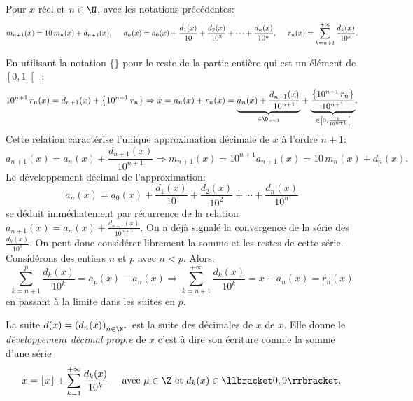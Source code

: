 \begin{propn} \label{devdec}
 Pour $x$ réel et $n\in \N$, avec les notations précédentes:
\[
 m_{n+1}(x) = 10\,m_n(x) + d_{n+1}(x),\hspace{0.5cm}
 a_n(x) = a_0(x) + \frac{d_1(x)}{10} + \frac{d_2(x)}{10^2} + \cdots + \frac{d_n(x)}{10^n},\hspace{0.5cm}
 r_n(x) = \sum_{k = n+1}^{+\infty} \frac{d_k(x)}{10^k}.
\]
\end{propn}
\begin{demo}
En utilisant la notation $\{ \}$ pour le reste de la partie entière qui est un élément de $\left[ 0,1\right[$ :
\[
 10^{n+1}\, r_n(x) = d_{n+1}(x) + \left\lbrace 10^{n+1}\, r_n\right\rbrace 
 \Rightarrow 
 x = a_n(x) + r_n(x) 
 = \underset{ \in \D_{n+1}}{\underbrace{a_n(x) + \frac{d_{n+1}(x)}{10^{n+1}}}} 
 + \underset{\in \left[ 0,\frac{1}{10^{n+1}}\right[ }{\underbrace{\frac{\left\lbrace 10^{n+1}\, r_n\right\rbrace}{10^{n+1}}}}. 
\]
Cette relation caractérise l'unique approximation décimale de $x$ à l'ordre $n+1$:
\[
 a_{n+1}(x) = a_n(x) + \frac{d_{n+1}(x)}{10^{n+1}}
 \Rightarrow
 m_{n+1}(x) = 10^{n+1}a_{n+1}(x) = 10\, m_n(x) + d_n(x).
\]
Le développement décimal de l'approximation:
\[
 a_n(x) = a_0(x) + \frac{d_1(x)}{10} + \frac{d_2(x)}{10^2} + \cdots + \frac{d_n(x)}{10^n}
\]
se déduit immédiatement par récurrence de la relation $a_{n+1}(x) = a_n(x) + \frac{d_{n+1}(x)}{10^{n+1}}$.\newline
On a déjà signalé la convergence de la série des $\frac{d_k(x)}{10^{k}}$. On peut donc considérer librement la somme et les restes de cette série. Considérons des entiers $n$ et $p$ avec $n < p$. Alors:
\[
 \sum_{k=n+1}^{p}\frac{d_k(x)}{10^{k}} = a_p(x) - a_n(x)
 \Rightarrow
 \sum_{k=n+1}^{+ \infty}\frac{d_k(x)}{10^{k}} = x - a_n(x) = r_n(x)
\]
en passant à la limite dans les suites en $p$.
\end{demo}
\begin{defi}
La suite $d(x) = \left( d_n(x)\right)_{n\in \N^*}$ est la suite des décimales de $x$  de $x$. Elle donne le \emph{développement décimal propre} de $x$ c'est à dire son écriture comme la somme d'une série
\[
 x = \lfloor x \rfloor + \sum_{k=1}^{+\infty} \frac{d_k(x)}{10^k} \hspace{0.5cm} \text{avec } \mu \in \Z \text{ et } d_k(x) \in \llbracket 0,9 \rrbracket.
\] 
\end{defi}


